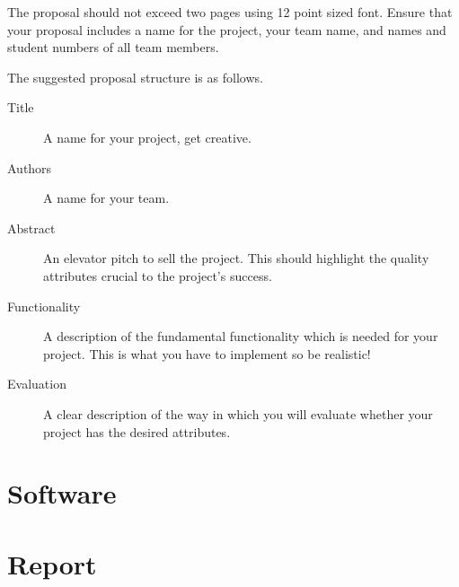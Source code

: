 \documentclass{csse4400}
\begin{document}
The proposal should not exceed two pages using 12 point sized font.
Ensure that your proposal includes a name for the project, your team name, and names and student numbers of all team members.

The suggested proposal structure is as follows.
\begin{description}
    \item[Title] A name for your project, get creative.
    \item[Authors] A name for your team.
    \item[Abstract] An elevator pitch to sell the project. This should highlight the quality attributes crucial to the project's success.
    \item[Functionality] A description of the fundamental functionality which is needed for your project. This is what you have to implement so be realistic!
    \item[Evaluation] A clear description of the way in which you will evaluate whether your project has the desired attributes.
\end{description}

\section{Software}

\section{Report}
\end{document}

